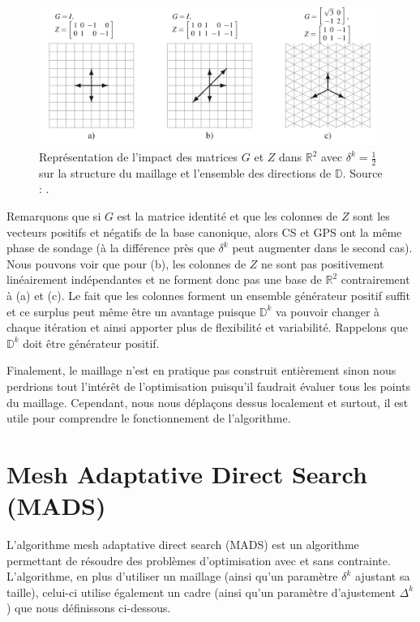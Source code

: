 \documentclass[french]{report}
\newcommand{\D}{\mathbb{D}}
\begin{document}
\begin{figure}[htbp]
    \centering
    \includegraphics[width=12cm]{GPS_GZ.png}
    \caption{Représentation de l'impact des matrices $G$ et $Z$ dans $\mathbb{R}^2$ avec $\delta^k=\frac{1}{2}$ sur la structure du maillage et l'ensemble des directions de $\D$. Source : \cite{AuHa2017a}.}
    \label{fig:GPS GZ}
\end{figure}

Remarquons que si $G$ est la matrice identité et que les colonnes de $Z$ sont les vecteurs positifs et négatifs de la base canonique, alors CS et GPS ont la même phase de sondage (à la différence près que $\delta^k$ peut augmenter dans le second cas). Nous pouvons voir que pour (b), les colonnes de $Z$ ne sont pas positivement linéairement indépendantes et ne forment donc pas une base de $\mathbb{R}^2$ contrairement à (a) et (c). Le fait que les colonnes forment un ensemble générateur positif suffit et ce surplus peut même être un avantage puisque $\D^k$ va pouvoir changer à chaque itération et ainsi apporter plus de flexibilité et variabilité. Rappelons que $\D^k$ doit être générateur positif.

Finalement, le maillage n'est en pratique pas construit entièrement sinon nous perdrions tout l'intérêt de l'optimisation puisqu'il faudrait évaluer tous les points du maillage. Cependant, nous nous déplaçons dessus localement et surtout, il est utile pour comprendre le fonctionnement de l'algorithme.

\section{Mesh Adaptative Direct Search (MADS)}
L'algorithme mesh adaptative direct search (MADS) est un algorithme permettant de résoudre des problèmes d'optimisation avec et sans contrainte. L'algorithme, en plus d'utiliser un maillage (ainsi qu'un paramètre $\delta^k$ ajustant sa taille), celui-ci utilise également un cadre (ainsi qu'un paramètre d'ajustement $\Delta^k$) que nous définissons ci-dessous.
\end{document}
